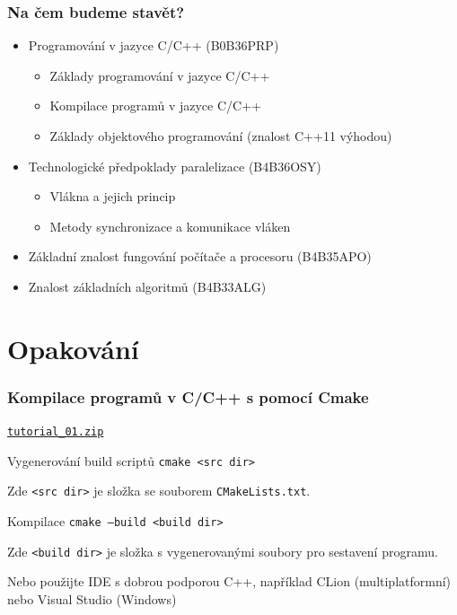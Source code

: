 \documentclass[usenames,dvipsnames,9pt]{beamer}
\newcommand{\download}[1]{\hfill\faDownload\hspace{5pt}\href{https://cw.fel.cvut.cz/wiki/_media/courses/be4m36mas/#1}{\tt #1}\\[1.3em]}
\begin{document}
\begin{frame}
  \frametitle{Na čem budeme stavět?}
  \begin{itemize}
    \item Programování v jazyce C/C++ {\small (B0B36PRP)}
          \begin{itemize}
            \item Základy programování v jazyce C/C++
            \item Kompilace programů v jazyce C/C++
            \item Základy objektového programování (znalost C++11 výhodou)
          \end{itemize}
    \pause
    \item Technologické předpoklady paralelizace {\small (B4B36OSY)}
          \begin{itemize}
            \item Vlákna a jejich princip
            \item Metody synchronizace a komunikace vláken
          \end{itemize}
    \pause
    \item Základní znalost fungování počítače a procesoru {\small (B4B35APO)}
    \pause
    \item Znalost základních algoritmů {\small (B4B33ALG)}
  \end{itemize}
\end{frame}

\section{Opakování}
\begin{frame}
  \frametitle{Kompilace programů v C/C++ s pomocí Cmake}
  \download{tutorial\_01.zip}
  \begin{block}{Vygenerování build scriptů}
    \texttt{cmake <src dir>}
  \end{block}
  Zde \texttt{<src dir>} je složka se souborem \texttt{CMakeLists.txt}.
  \vspace{1em}
  \begin{block}{Kompilace}
    \texttt{cmake --build <build dir>}
  \end{block}
  Zde \texttt{<build dir>} je složka s vygenerovanými soubory pro sestavení programu.

  Nebo použijte IDE s dobrou podporou C++, například CLion (multiplatformní) nebo Visual Studio (Windows)
\end{frame}
\end{document}
